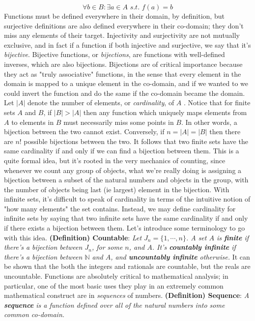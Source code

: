 \documentclass{article}
\newcommand*{\tb}{\textbf}
\newcommand*{\ti}{\textit}
\newcommand*{\nn}{\newline \newline}
\newcommand*{\N}{\mathbb{N}}
\newcommand*{\sti}{\textit{ s.t. }}
\begin{document}
    $$ \forall b \in B: \exists a \in A \sti f(a) = b $$
Functions must be defined everywhere in their domain, by definition, but surjective definitions are also defined everywhere in their co-domain; they don't miss any elements of their target. Injectivity and surjectivity are not mutually exclusive, and in fact if a function if both injective and surjective, we say that it's \ti{bijective}. Bijective functions, or \ti{bijections}, are functions with well-defined inverses, which are also bijections. Bijections are of critical importance because they act as "truly associative" functions, in the sense that every element in the domain is mapped to a unique element in the co-domain, and if we wanted to we could invert the function and do the same if the co-domain became the domain.
\nn
Let $ | A | $ denote the number of elements, or \ti{cardinality}, of $ A $ . Notice that for finite sets $ A $ and $ B $, if $ | B | > | A | $ then any function which uniquely maps elements from $ A $ to elements in $ B $ must necessarily miss some points in $ B $. In other words, a bijection between the two cannot exist. Conversely, if $ n = | A | = | B | $ then there are $ n! $ possible bijections between the two. It follows that two finite sets have the same cardinality if and only if we can find a bijection between them. This is a quite formal idea, but it's rooted in the very mechanics of counting, since whenever we count any group of objects, what we're really doing is assigning a bijection between a subset of the natural numbers and objects in the group, with the number of objects being last (ie largest) element in the bijection.
\nn
With infinite sets, it's difficult to speak of cardinality in terms of the intuitive notion of "how many elements" the set contains. Instead, we may define cardinality for infinite sets by saying that two infinite sets have the same cardinality if and only if there exists a bijection between them. Let's introduce some terminology to go with this idea.
\nn
\tb{(Definition) Countable}: \ti{Let $ J_n = \{ 1, \cdots, n \} $. A set $ A $ is \tb{finite} if there's a bijection between $ J_n $, for some $ n $, and $ A $. It's \tb{countably infinite} if there's a bijection between $ \N $ and $ A $, and \tb{uncountably infinite} otherwise.}
\nn
It can be shown that the both the integers and rationals are countable, but the reals are uncountable. Functions are absolutely critical to mathematical analysis; in particular, one of the most basic uses they play in an extremely common mathematical construct are in \ti{sequences} of numbers.
\nn
\tb{(Definition) Sequence}: \ti{A \tb{sequence} is a function defined over all of the natural numbers into some common co-domain.}
\end{document}
